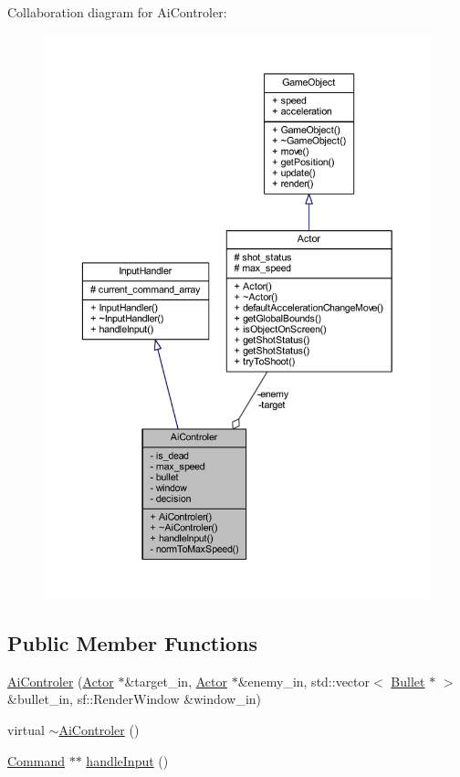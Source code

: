 Collaboration diagram for Ai\+Controler\+:
\nopagebreak
\begin{figure}[H]
\begin{center}
\leavevmode
\includegraphics[width=350pt]{class_ai_controler__coll__graph}
\end{center}
\end{figure}
\subsection*{Public Member Functions}
\begin{DoxyCompactItemize}
\item 
\hyperlink{class_ai_controler_a33bdaad21e07f2d93ae0ea277035193b}{Ai\+Controler} (\hyperlink{class_actor}{Actor} $\ast$\&target\+\_\+in, \hyperlink{class_actor}{Actor} $\ast$\&enemy\+\_\+in, std\+::vector$<$ \hyperlink{class_bullet}{Bullet} $\ast$ $>$ \&bullet\+\_\+in, sf\+::\+Render\+Window \&window\+\_\+in)
\item 
virtual \hyperlink{class_ai_controler_aa58de5f8ccbff5d293c57cdf2a80e8c5}{$\sim$\+Ai\+Controler} ()
\item 
\hyperlink{class_command}{Command} $\ast$$\ast$ \hyperlink{class_ai_controler_a72891536d5ff122ae1e3a25fd62fd1b5}{handle\+Input} ()
\end{DoxyCompactItemize}

